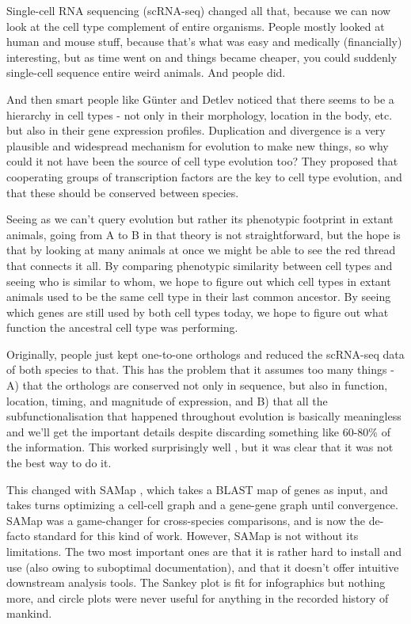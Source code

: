 \documentclass{article}
\begin{document}
Single-cell RNA sequencing (scRNA-seq) changed all that, because we can now look at the cell type
complement of entire organisms. People mostly looked at human and mouse stuff, because that's what
was easy and medically (financially) interesting, but as time went on and things became cheaper, you
could suddenly single-cell sequence entire weird animals. And people did.

And then smart people like Günter and Detlev noticed that there seems to be a hierarchy in cell
types - not only in their morphology, location in the body, etc. but also in their gene expression
profiles. Duplication and divergence is a very plausible and widespread mechanism for evolution to
make new things, so why could it not have been the source of cell type evolution too? They proposed
that cooperating groups of transcription factors are the key to cell type evolution, and that these
should be conserved between species.

Seeing as we can't query evolution but rather its phenotypic footprint in extant animals, going from
A to B in that theory is not straightforward, but the hope is that by looking at many animals at
once we might be able to see the red thread that connects it all. By comparing phenotypic similarity
between cell types and seeing who is similar to whom, we hope to figure out which cell types in
extant animals used to be the same cell type in their last common ancestor. By seeing which genes
are still used by both cell types today, we hope to figure out what function the ancestral cell type
was performing.

Originally, people just kept one-to-one orthologs and reduced the scRNA-seq data of both species to
that. This has the problem that it assumes too many things - A) that the orthologs are conserved not
only in sequence, but also in function, location, timing, and magnitude of expression, and B) that
all the subfunctionalisation that happened throughout evolution is basically meaningless and we'll
get the important details despite discarding something like 60-80\% of the information. This worked
surprisingly well \cite{welch2019single}, but it was clear that it was not the best way to do it.

This changed with SAMap \cite{tarashansky2021mapping}, which takes a BLAST map of genes as input,
and takes turns optimizing a cell-cell graph and a gene-gene graph until convergence. SAMap was a
game-changer for cross-species comparisons, and is now the de-facto standard for this kind of work.
However, SAMap is not without its limitations. The two most important ones are that it is rather
hard to install and use (also owing to suboptimal documentation), and that it doesn't offer
intuitive downstream analysis tools. The Sankey plot is fit for infographics but nothing more, and
circle plots were never useful for anything in the recorded history of mankind.
\end{document}
